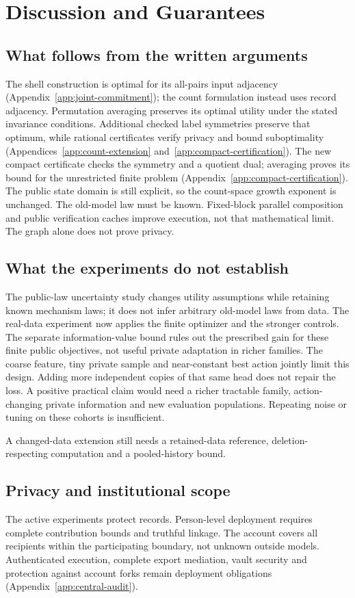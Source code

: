\documentclass{article}
\begin{document}
\section{Discussion and Guarantees}
\label{sec:discussion}
\subsection{What follows from the written arguments}
The shell construction is optimal for its all-pairs input adjacency
(Appendix~\ref{app:joint-commitment}); the count formulation instead
uses record adjacency. Permutation averaging preserves its optimal
utility under the stated invariance conditions. Additional checked
label symmetries preserve that optimum, while rational
certificates verify privacy and bound suboptimality
(Appendices~\ref{app:count-extension} and~\ref{app:compact-certification}).
The new compact certificate checks the symmetry and a quotient dual;
averaging proves its bound for the unrestricted finite problem
(Appendix~\ref{app:compact-certification}). The public state domain is
still explicit, so the count-space growth exponent is unchanged.
The old-model law must be known. Fixed-block parallel composition and
public verification caches improve execution, not that mathematical limit.
The graph alone does not prove privacy.

\subsection{What the experiments do not establish}
The public-law uncertainty study changes utility assumptions while
retaining known mechanism laws; it does not infer arbitrary old-model
laws from data. The real-data experiment now applies the finite optimizer
and the stronger controls. The separate information-value bound rules
out the prescribed gain for these finite public objectives, not useful private adaptation in richer
families. The coarse feature, tiny private sample and near-constant best
action jointly limit this design. Adding more independent copies of that
same head does not repair the loss. A positive practical claim would need
a richer tractable family, action-changing private information and new
evaluation populations. Repeating noise or tuning on these cohorts is
insufficient.

A changed-data extension still needs a retained-data reference,
deletion-respecting computation and a pooled-history bound.

\subsection{Privacy and institutional scope}
\label{sec:privacy-basis}
The active experiments protect records. Person-level deployment requires
complete contribution bounds and truthful linkage. The account covers
all recipients within the participating boundary, not unknown outside
models. Authenticated execution, complete export mediation, vault security
and protection against account forks remain deployment obligations
(Appendix~\ref{app:central-audit}).
\end{document}

